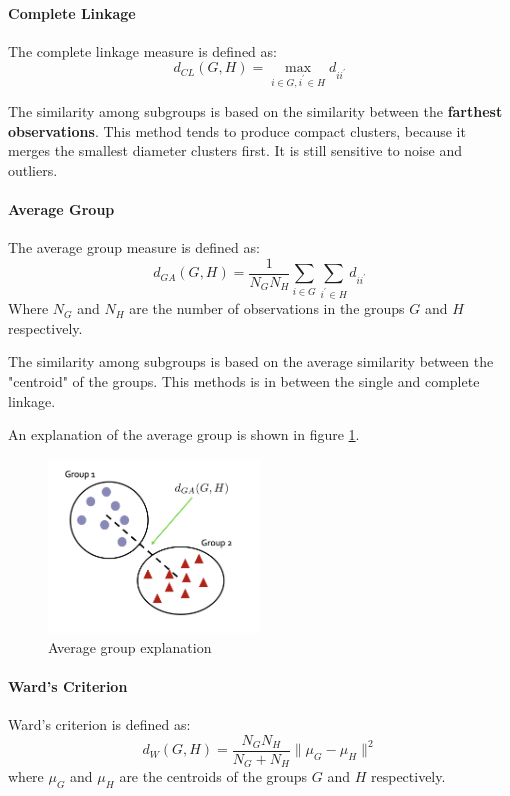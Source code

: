 \paragraph*{Complete Linkage}
The complete linkage measure is defined as:
\[
    d_{CL}(G,H) = \max_{i \in G, i^{\prime} \in H} d_{ii^{\prime}}
\]

The similarity among subgroups is based on the similarity between the \textbf{farthest observations}. This method tends to produce compact clusters, because it merges the smallest diameter clusters first. It is still sensitive to noise and outliers.

\paragraph*{Average Group}
The average group measure is defined as:
\[
    d_{GA}(G,H) = \frac{1}{N_G N_H} \sum_{i \in G} \sum_{i^{\prime} \in H} d_{ii^{\prime}}
\]
Where $N_G$ and $N_H$ are the number of observations in the groups $G$ and $H$ respectively.

The similarity among subgroups is based on the average similarity between the "centroid" of the groups. This methods is in between the single and complete linkage.

An explanation of the average group is shown in figure \ref{fig:averagegroup}.
\begin{figure}[h]
    \centering
    \includegraphics[width=0.5\textwidth]{./figures/chapter_7/averagegroup.png}
    \caption{Average group explanation}
    \label{fig:averagegroup}
\end{figure}

\paragraph*{Ward's Criterion}
Ward's criterion is defined as:
\[
    d_W(G,H) = \frac{N_G N_H}{N_G + N_H} \| \mu_G - \mu_H \|^2
\]
where $\mu_G$ and $\mu_H$ are the centroids of the groups $G$ and $H$ respectively.

